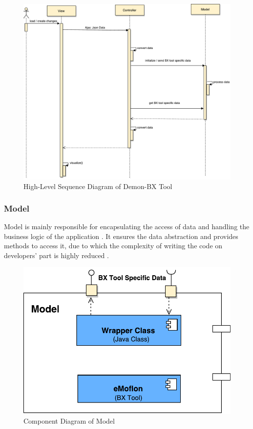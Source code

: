 \begin{figure}
	\includegraphics[width=1\textwidth]{figures/Sequence_Diagram-HighLevel}
	\caption{High-Level Sequence Diagram of Demon-BX Tool}
	\label{fig:Sequence_Diagram-HighLevel}
\end{figure}

\subsubsection{Model}\label{subsubsec:design_model}
Model is mainly responsible for encapsulating the access of data and handling the business logic of the application \cite{designpattern-headfirst} \cite{mvc-arch}. It ensures the data abstraction and provides methods to access it, due to which the complexity of writing the code on developers' part is highly reduced \cite{mdd-webwithmvc}.

\begin{figure}
	\includegraphics[width=1\textwidth]{figures/Component_Diagram-Model}
	\caption{Component Diagram of Model}
	\label{fig:Component_Diagram-Model}
\end{figure}

